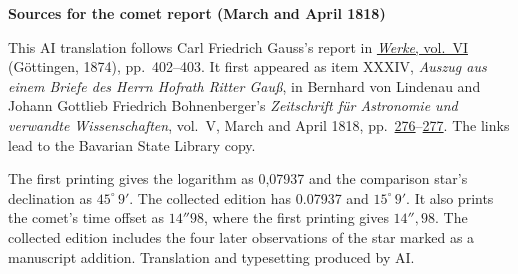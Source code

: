 \clearpage\thispagestyle{empty}
\begin{center}\textbf{Sources for the comet report (March and April 1818)}\end{center}
\noindent This AI translation follows Carl Friedrich Gauss’s report in \href{https://gdz.sub.uni-goettingen.de/id/PPN236007467}{\textit{Werke}, vol.~VI} (Göttingen, 1874), pp.~402--403. It first appeared as item XXXIV, \textit{Auszug aus einem Briefe des Herrn Hofrath Ritter Gauß}, in Bernhard von Lindenau and Johann Gottlieb Friedrich Bohnenberger’s \textit{Zeitschrift für Astronomie und verwandte Wissenschaften}, vol.~V, March and April 1818, pp.~\href{https://api.digitale-sammlungen.de/iiif/image/v2/bsb10061007_00286/full/1600,/0/default.jpg}{276}--\href{https://api.digitale-sammlungen.de/iiif/image/v2/bsb10061007_00287/full/1600,/0/default.jpg}{277}. The links lead to the Bavarian State Library copy.
\par\smallskip\noindent The first printing gives the logarithm as 0,07937 and the comparison star’s declination as $45^\circ\,9'$. The collected edition has 0.07937 and $15^\circ\,9'$. It also prints the comet’s time offset as $14''98$, where the first printing gives $14''{,}98$. The collected edition includes the four later observations of the star marked as a manuscript addition. Translation and typesetting produced by AI.
\clearpage
